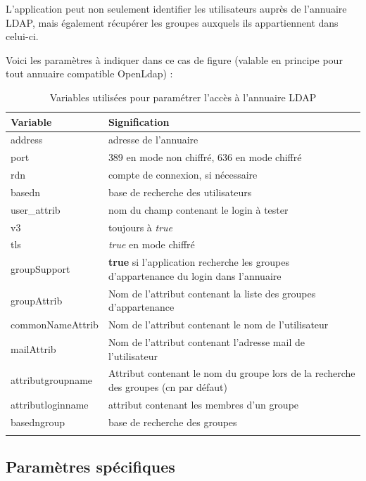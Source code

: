 L'application peut non seulement identifier les utilisateurs auprès de l'annuaire LDAP, mais également récupérer les groupes auxquels ils appartiennent dans celui-ci.

Voici les paramètres à indiquer dans ce cas de figure (valable en principe pour tout annuaire compatible OpenLdap) : 
\begin{longtable}{|p{4cm}|p{11cm}|}
\hline
\textbf{Variable} & \textbf{Signification} \\
\hline
\endhead
address &  adresse de l'annuaire\\
\hline
port & 389 en mode non chiffré, 636 en mode chiffré\\
\hline
rdn & compte de connexion, si nécessaire \\
\hline
basedn & base de recherche des utilisateurs\\
\hline
user\_attrib & nom du champ contenant le login à tester\\
\hline
v3 & toujours à \textit{true}\\
\hline
tls & \textit{true} en mode chiffré\\
\hline
groupSupport & \textbf{true} si l'application recherche les groupes d'appartenance du login dans l'annuaire\\
\hline
groupAttrib & Nom de l'attribut contenant la liste des groupes d'appartenance\\
\hline
commonNameAttrib & Nom de l'attribut contenant le nom de l'utilisateur\\
\hline
mailAttrib & Nom de l'attribut contenant l'adresse mail de l'utilisateur\\
\hline
attributgroupname & Attribut contenant le nom du groupe lors de la recherche des groupes (cn par défaut)\\
\hline
attributloginname & attribut contenant les membres d'un groupe\\
\hline
basedngroup & base de recherche des groupes \\
\hline
\caption{Variables utilisées pour paramétrer l'accès à l'annuaire LDAP}
\end{longtable}

\subsection{Paramètres spécifiques}
\label{paramspec}

